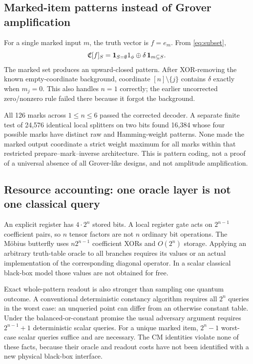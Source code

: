 \subsection{Marked-item patterns instead of Grover amplification}
For a single marked input $m$, the truth vector is $f=e_m$. From \cref{eq:subset},
\begin{equation}\label{eq:marked}
 \mathfrak C[f]_S=\mathbf1_{S=\emptyset}1_{\phi}
 \oplus\delta\,\mathbf1_{m\subseteq S}.
\end{equation}
The marked set produces an upward-closed pattern. After XOR-removing the known empty-coordinate background, coordinate $[n]\setminus\{j\}$ contains $\delta$ exactly when $m_j=0$. This also handles $n=1$ correctly; the earlier uncorrected zero/nonzero rule failed there because it forgot the background.

All 126 marks across $1\le n\le6$ passed the corrected decoder. A separate finite test of 24,576 identical local splitters on two bits found 16,384 whose four possible marks have distinct raw and Hamming-weight patterns. None made the marked output coordinate a strict weight maximum for all marks within that restricted prepare--mark--inverse architecture. This is pattern coding, not a proof of a universal absence of all Grover-like designs, and not amplitude amplification.

\subsection{Resource accounting: one oracle layer is not one classical query}
An explicit register has $4\cdot2^n$ stored bits. A local register gate acts on $2^{n-1}$ coefficient pairs, so $n$ tensor factors are not $n$ ordinary bit operations. The M\"obius butterfly uses $n2^{n-1}$ coefficient XORs and $O(2^n)$ storage. Applying an arbitrary truth-table oracle to all branches requires its values or an actual implementation of the corresponding diagonal operator. In a scalar classical black-box model those values are not obtained for free.

Exact whole-pattern readout is also stronger than sampling one quantum outcome. A conventional deterministic constancy algorithm requires all $2^n$ queries in the worst case: an unqueried point can differ from an otherwise constant table. Under the balanced-or-constant promise the usual adversary argument requires $2^{n-1}+1$ deterministic scalar queries. For a unique marked item, $2^n-1$ worst-case scalar queries suffice and are necessary. The CM identities violate none of these facts, because their oracle and readout costs have not been identified with a new physical black-box interface.

